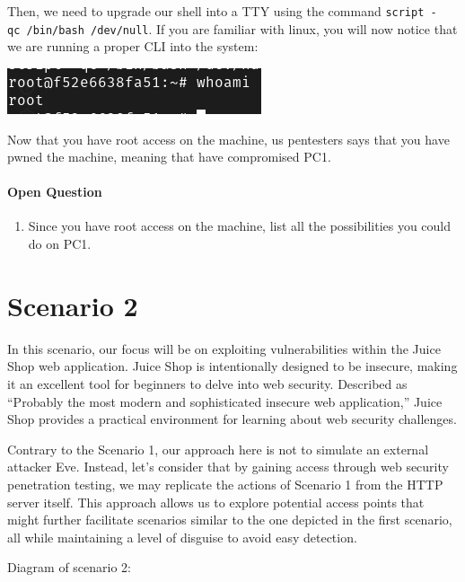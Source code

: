 \documentclass[a4paper,11pt,singlespacing]{article}
\providecommand{\tightlist}{%
  \setlength{\itemsep}{0pt}\setlength{\parskip}{0pt}}
\begin{document}
Then, we need to upgrade our shell into a TTY using the command
\texttt{script\ -qc\ /bin/bash\ /dev/null}. If you are familiar with
linux, you will now notice that we are running a proper CLI into the
system:

\includegraphics{./Images/Image06.png}

Now that you have root access on the machine, us pentesters says that
you have pwned the machine, meaning that have compromised PC1.

\paragraph{Open Question}\label{open-question}

\begin{enumerate}
\def\labelenumi{\arabic{enumi}.}
\tightlist
\item
  Since you have root access on the machine, list all the possibilities
  you could do on PC1.
\end{enumerate}

\newpage

\section{Scenario 2}\label{scenario-2}

In this scenario, our focus will be on exploiting vulnerabilities within
the Juice Shop web application. Juice Shop is intentionally designed to
be insecure, making it an excellent tool for beginners to delve into web
security. Described as ``Probably the most modern and sophisticated
insecure web application,'' Juice Shop provides a practical environment
for learning about web security challenges.

Contrary to the Scenario 1, our approach here is not to simulate an
external attacker Eve. Instead, let's consider that by gaining access
through web security penetration testing, we may replicate the actions
of Scenario 1 from the HTTP server itself. This approach allows us to
explore potential access points that might further facilitate scenarios
similar to the one depicted in the first scenario, all while maintaining
a level of disguise to avoid easy detection.

\newpage

Diagram of scenario 2:
\end{document}
